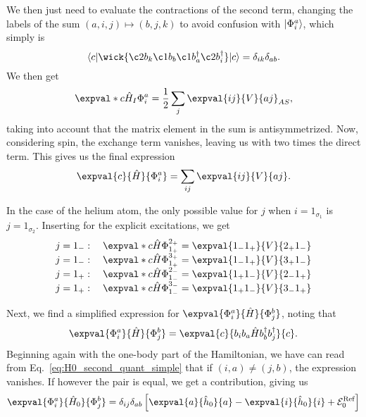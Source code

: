 We then just need to evaluate the contractions of the second term, changing the labels of the sum $(a, i, j) \mapsto (b, j, k)$ to avoid confusion with $\lvert\Phi_i^a\rangle$, which simply is
\begin{equation*}
    \langle c \vert
    \wick{
        \c2 b_k \c1 b_b \c1 b_a^\dagger \c2 b_i^\dagger
    }
    \vert c \rangle
    = \delta_{ik} \delta_{ab}.
\end{equation*}
We then get
\begin{equation}\label{eq:1p1h-ground-twobody}
    \expval*{c}{\hat{H}_I}{\Phi_i^a} = \frac{1}{2} \sum_{j} \expval{i j}{V}{a j}_{AS},
\end{equation}
taking into account that the matrix element in the sum is antisymmetrized.
Now, considering spin, the exchange term vanishes, leaving us with two times the direct term.
This gives us the final expression
\begin{equation}\label{eq:1p1h-ground}
    \expval{c}{\hat{H}}{\Phi_i^a} = \sum_{ij} \expval{ij}{V}{aj}.
\end{equation}

In the case of the helium atom, the only possible value for $j$ when $i = 1_{\sigma_1}$ is $j = 1_{\sigma_2}$.
Inserting for the explicit excitations, we get
\begin{equation}\label{eq:1p1h-ground-list}
    \arraycolsep=1.4pt
    \begin{array}{crcl}
        j = 1_{-}: \quad
        & \expval*{c}{\hat{H}}{\Phi_{1_{+}}^{2_{+}}}\hspace{0.27pt}
        & = &
        \expval{1_{-} 1_{+}}{V}{2_{+} 1_{-}} \\

        j = 1_{-}: \quad
        & \expval*{c}{\hat{H}}{\Phi_{1_{+}}^{3_{+}}}\hspace{0.27pt}
        & = &
        \expval{1_{-} 1_{+}}{V}{3_{+} 1_{-}} \\

        j = 1_{+}: \quad
        & \expval*{c}{\hat{H}}{\Phi_{1_{-}}^{2_{-}}}
        & = &
        \expval{1_{+} 1_{-}}{V}{2_{-} 1_{+}} \\

        j = 1_{+}: \quad
        & \expval*{c}{\hat{H}}{\Phi_{1_{-}}^{3_{-}}}
        & = &
        \expval{1_{+} 1_{-}}{V}{3_{-} 1_{+}}
    \end{array}
\end{equation}

Next, we find a simplified expression for $\expval{\Phi_i^a}{\hat{H}}{\Phi_j^b}$,
noting that
\begin{equation*}
    \expval{\Phi_i^a}{\hat{H}}{\Phi_j^b} = \expval{c}{b_i b_a \hat{H} b_b^\dagger b_j^\dagger}{c}.
\end{equation*}
Beginning again with the one-body part of the Hamiltonian, we have can read from Eq.~\eqref{eq:H0_second_quant_simple} that if $(i, a) \neq (j, b)$, the expression vanishes.
If however the pair is equal, we get a contribution, giving us
\begin{equation*}
    \expval{\Phi_i^a}{\hat{H}_0}{\Phi_j^b} = \delta_{ij} \delta_{ab} \left[ \expval{a}{\hat{h}_0}{a} - \expval{i}{\hat{h}_0}{i} + \mathcal{E}_0^{\text{Ref}} \right]
\end{equation*}

